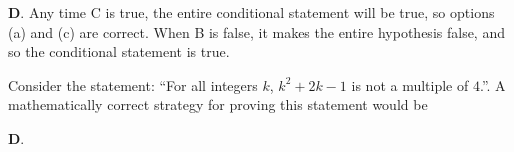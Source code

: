 \documentclass[addpoints]{exam}
\begin{document}
\begin{questions}
\begin{solution}
	\textbf{D}. Any time C is true, the entire conditional statement will be true, so options (a) and (c) are correct. When B is false, it makes the entire hypothesis false, and so the conditional statement is true. 
\end{solution}

\question[2] Consider the statement: ``For all integers $k$, $k^2 + 2k - 1$ is not a multiple of $4$.''. A mathematically correct strategy for proving this statement would be
	
\begin{solution}
	\textbf{D}. 
\end{solution}



\end{questions}
\end{document}
